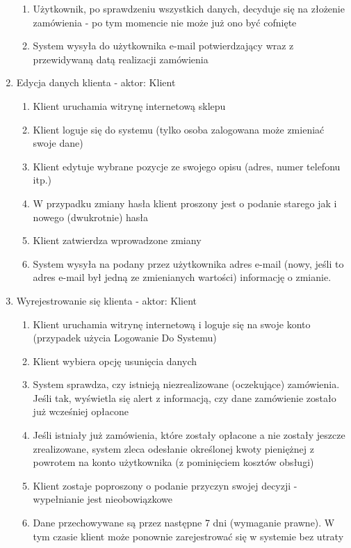 \begin{enumerate}
\begin{enumerate}
    \item Użytkownik, po sprawdzeniu wszystkich danych, decyduje się na złożenie
    zamówienia - po tym momencie nie może już ono być cofnięte
    \item System wysyła do użytkownika e-mail potwierdzający wraz z przewidywaną
    datą realizacji zamówienia
  \end{enumerate} 
  \item Edycja danych klienta - aktor: Klient
  \begin{enumerate}
    \item Klient uruchamia witrynę internetową sklepu
    \item Klient loguje się do systemu (tylko osoba zalogowana może zmieniać
    swoje dane)
    \item Klient edytuje wybrane pozycje ze swojego opisu (adres, numer
    telefonu itp.)
    \item W przypadku zmiany hasła klient proszony jest o podanie starego jak i
    nowego (dwukrotnie) hasła
    \item Klient zatwierdza wprowadzone zmiany
    \item System wysyła na podany przez użytkownika adres e-mail (nowy, jeśli
    to adres e-mail był jedną ze zmienianych wartości) informację o zmianie.
  \end{enumerate}
  \item Wyrejestrowanie się klienta - aktor: Klient
  \begin{enumerate}
    \item Klient uruchamia witrynę internetową i loguje się na swoje konto
    (przypadek użycia Logowanie Do Systemu)
    \item Klient wybiera opcję usunięcia danych
    \item System sprawdza, czy istnieją niezrealizowane (oczekujące) zamówienia.
    Jeśli tak, wyświetla się alert z informacją, czy dane zamówienie zostało już
    wcześniej opłacone
    \item Jeśli istniały już zamówienia, które zostały opłacone a nie zostały
    jeszcze zrealizowane, system zleca odesłanie określonej kwoty pieniężnej z
    powrotem na konto użytkownika (z pominięciem kosztów obsługi)
    \item Klient zostaje poproszony o podanie przyczyn swojej decyzji -
    wypełnianie jest nieobowiązkowe
    \item Dane przechowywane są przez następne 7 dni (wymaganie prawne). W tym
    czasie klient może ponownie zarejestrować się w systemie bez utraty

\end{enumerate}
\end{enumerate}
